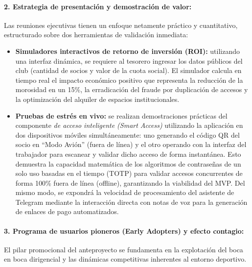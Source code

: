 \paragraph{2. Estrategia de presentación y demostración de valor:}

Las reuniones ejecutivas tienen un enfoque netamente práctico y cuantitativo, estructurado sobre dos herramientas de validación inmediata:
\begin{itemize}
    \item \textbf{Simuladores interactivos de retorno de inversión (ROI):} utilizando una interfaz dinámica, se requiere al tesorero ingresar los datos públicos del club (cantidad de socios y valor de la cuota social). El simulador calcula en tiempo real el impacto económico positivo que representa la reducción de la morosidad en un 15\%, la erradicación del fraude por duplicación de accesos y la optimización del alquiler de espacios institucionales.
    \item \textbf{Pruebas de estrés en vivo:} se realizan demostraciones prácticas del componente \textit{de acceso inteligente (Smart Access)} utilizando la aplicación en dos dispositivos móviles simultáneamente: uno generando el código QR del socio en ``Modo Avión'' (fuera de línea) y el otro operando con la interfaz del trabajador para escanear y validar dicho acceso de forma instantánea. Esto demuestra la capacidad matemática de los algoritmos de contraseñas de un solo uso basadas en el tiempo (TOTP) para validar accesos concurrentes de forma 100\% fuera de línea (offline), garantizando la viabilidad del MVP. Del mismo modo, se expondrá la velocidad de procesamiento del asistente de Telegram mediante la interacción directa con notas de voz para la generación de enlaces de pago automatizados.
\end{itemize}

\paragraph{3. Programa de usuarios pioneros (Early Adopters) y efecto contagio:} El pilar promocional del anteproyecto se fundamenta en la explotación del boca en boca dirigencial y las dinámicas competitivas inherentes al entorno deportivo.


